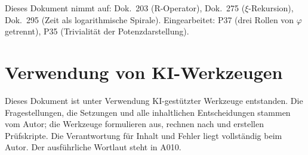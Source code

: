 Dieses Dokument nimmt auf: Dok.~203 (R-Operator), Dok.~275 ($\xi$-Rekursion),
Dok.~295 (Zeit als logarithmische Spirale). Eingearbeitet: P37 (drei Rollen von $\varphi$ getrennt), P35 (Trivialität der Potenzdarstellung).

\section{Verwendung von KI-Werkzeugen}

Dieses Dokument ist unter Verwendung KI-gestützter Werkzeuge entstanden. Die
Fragestellungen, die Setzungen und alle inhaltlichen Entscheidungen stammen vom
Autor; die Werkzeuge formulieren aus, rechnen nach und erstellen Prüfskripte.
Die Verantwortung für Inhalt und Fehler liegt vollständig beim Autor. Der
ausführliche Wortlaut steht in A010.
